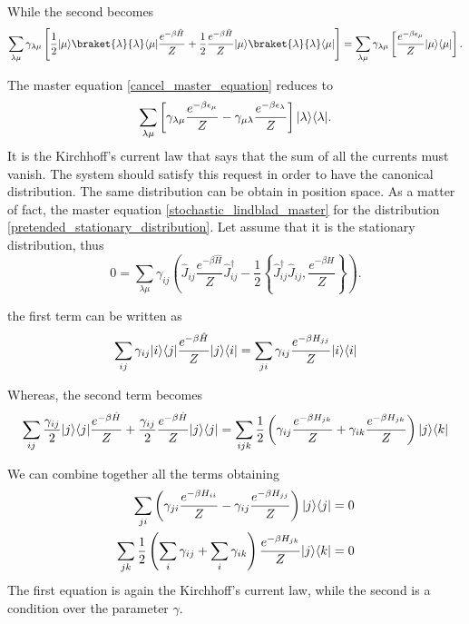 While the second becomes
\begin{equation}
    \sum_{\lambda\mu} \gamma_{\lambda\mu}\left[\frac{1}{2}\ket{\mu}\braket{\lambda}{\lambda}\bra{\mu}\frac{e^{-\beta\hat H}}{Z} +\frac{1}{2}\frac{e^{-\beta\hat H}}{Z}\ket{\mu}\braket{\lambda}{\lambda}\bra{\mu}\right]= \sum_{\lambda\mu} \gamma_{\lambda\mu}\left[\frac{e^{-\beta \epsilon_\mu}}{Z}\ket{\mu}\bra{\mu}\right].
\end{equation}

The master equation \eqref{cancel_master_equation} reduces to 
\begin{equation}
    \sum_{\lambda\mu}\left[\gamma_{\lambda\mu}\frac{e^{-\beta \epsilon_\mu}}{Z} - \gamma_{\mu\lambda}\frac{e^{-\beta \epsilon_\lambda}}{Z}\right]\lvert\lambda\rangle\langle\lambda\rvert.
\end{equation}
It is the Kirchhoff's current law that says that the sum of all the currents must vanish. The system should satisfy this request in order to have the canonical distribution.
The same distribution can be obtain in position space. As a matter of fact, the master equation \eqref{stochastic_lindblad_master} for the distribution \eqref{pretended_stationary_distribution}. Let assume that it is the stationary distribution, thus
\begin{equation}
    0 = \sum_{\lambda\mu} \gamma_{ij} \left(\hat J_{ij}  \frac{e^{-\beta\hat H}}{Z} \hat J^\dagger_{ij} - \frac{1}{2}\left\{ \hat J^\dagger_{ij}\hat J_{ij},  \frac{e^{-\beta\hat H}}{Z}\right\} \right).
\end{equation}

the first term can be written as
\begin{equation}
    \sum_{ij} \gamma_{ij} \lvert i\rangle\langle j\rvert  \frac{e^{-\beta\hat H}}{Z} \lvert j\rangle\langle i\rvert = 
    \sum_{ji} \gamma_{ij} \frac{e^{-\beta H_{jj}}}{Z} \lvert i\rangle\langle i\rvert
\end{equation}

Whereas, the second term becomes
\begin{equation}
    \sum_{ij}\frac{\gamma_{ij}}{2}\lvert j\rangle\langle j\rvert \frac{e^{-\beta\hat H}}{Z} + \frac{\gamma_{ij}}{2}\frac{e^{-\beta\hat H}}{Z}\lvert j\rangle\langle j\rvert=
    \sum_{ijk} \frac{1}{2}\left(\gamma_{ij}\frac{e^{-\beta H_{jk}}}{Z} + \gamma_{ik}\frac{e^{-\beta H_{jk}}}{Z}\right)\lvert j\rangle\langle k\rvert
\end{equation}

We can combine together all the terms obtaining
\begin{equation}
    \begin{split}
        \sum_{ji} \left(\gamma_{ji}\frac{e^{-\beta H_{ii}}}{Z} - \gamma_{ij}\frac{e^{-\beta H_{jj}}}{Z}\right)\lvert j\rangle\langle j\rvert = 0\\
        \sum_{jk} \frac{1}{2}\left(\sum_i\gamma_{ij} + \sum_i\gamma_{ik}   \right)\frac{e^{-\beta H_{jk}}}{Z}\lvert j\rangle\langle k\rvert = 0\\
    \end{split}
\end{equation}
The first equation is again the Kirchhoff's current law, while the second is a condition over the parameter $\gamma$.

